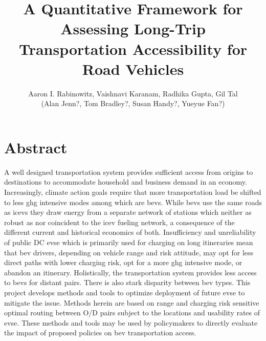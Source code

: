 \documentclass[11pt]{article}
\title{A Quantitative Framework for Assessing Long-Trip Transportation Accessibility for Road Vehicles}
\author{Aaron I. Rabinowitz, Vaishnavi Karanam, Radhika Gupta, Gil Tal\\(Alan Jenn?, Tom Bradley?, Susan Handy?, Yueyue Fan?)}
\date{}
\begin{document}
\maketitle

\section*{Abstract}

A well designed transportation system provides sufficient access from origins to destinations to accommodate household and business demand in an economy.  Increasingly, climate action goals require that more transportation load be shifted to less \gls{ghg} intensive modes among which are \glspl{bev}. While \glspl{bev} use the same roads as \glspl{icev} they draw energy from a separate network of stations which neither as robust as nor coincident to the \gls{icev} fueling network, a consequence of the different current and historical economics of both. Insufficiency and unreliability of public DC \gls{evse} which is primarily used for charging on long itineraries mean that \gls{bev} drivers, depending on vehicle range and risk attitude, may opt for less direct paths with lower charging risk, opt for a more \gls{ghg} intensive mode, or abandon an itinerary. Holistically, the transportation system provides less access to \glspl{bev} for distant pairs. There is also stark disparity between \gls{bev} types. This project develops methods and tools to optimize deployment of future \gls{evse} to mitigate the issue. Methods herein are based on range and charging risk sensitive optimal routing between O/D pairs subject to the locations and usability rates of \gls{evse}. These methods and tools may be used by policymakers to directly evaluate the impact of proposed policies on \gls{bev} transportation access.
\medskip
\end{document}
